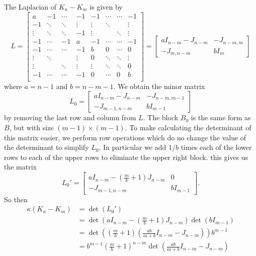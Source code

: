 \documentclass[12pt]{article}
\begin{document}
The Laplacian of $K_n-K_m$ is given by
\[L=
    \begin{bmatrix}
        a      & -1     & \cdots & -1     & -1     & \cdots & \cdots & -1     \\
        -1     & \ddots & \ddots & \vdots & \vdots & \ddots &        & \vdots \\
        \vdots & \ddots & \ddots & -1     & \vdots &        & \ddots & \vdots \\
        -1     & \cdots & -1     & a      & -1     & \cdots & \cdots & -1     \\
    
        -1     & \cdots & \cdots & -1     & b      & 0      & \cdots & 0      \\
        \vdots & \ddots &        & \vdots & 0      & \ddots & \ddots & \vdots \\
        \vdots &        & \ddots & \vdots & \vdots & \ddots & \ddots & 0      \\
        -1     & \cdots & \cdots & -1     & 0      & \cdots & 0      & b      \\
    \end{bmatrix}
    =
    \begin{bmatrix}
        aI_{n-m}-J_{n-m}   & -J_{n-m,m} \\
        -J_{m,n-m} & bI_{m}
    \end{bmatrix}
\]
where $a=n-1$ and $b=n-m-1$. We obtain the minor matrix
\[L_0 =
    \begin{bmatrix}
        aI_{n-m}-J_{n-m}   & -J_{n-m,m-1} \\
        -J_{m-1,n-m} & bI_{m-1}
    \end{bmatrix}
\]
by removing the last row and column from $L$. The block $B_0$ is the same form as $B$, but with size $(m-1)\times(m-1)$. To make calculating the determinant of this matrix easier, we perform row operations which do no change the value of the determinant to simplify $L_0$. In particular we add $1/b$ times each of the lower rows to each of the upper rows to eliminate the upper right block. this gives us the matrix
\[L_0' =
    \begin{bmatrix}
        aI_{n-m}-(\frac{m}{b}+1)J_{n-m}   & 0 \\
        -J_{m-1,n-m} & bI_{m-1}
    \end{bmatrix}.
\]
So then
\begin{align*}
    \kappa (K_n-K_m)
        &= \det(L_0')\\
        &= \det\left(aI_{n-m}-\left(\frac{m}{b}+1\right)J_{n-m}\right)\det(bI_{m-1}) \\
        &= \det\left(\left(\frac{m}{b}+1\right)\left(\frac{ab}{m+b}I_{n-m}-J_{n-m}\right)\right)b^{m-1} \\
        &= b^{m-1}\left(\frac{m}{b}+1\right)^{n-m}\det\left(\frac{ab}{m+b}I_{n-m}-J_{n-m}\right) \\
\end{align*}
\end{document}
